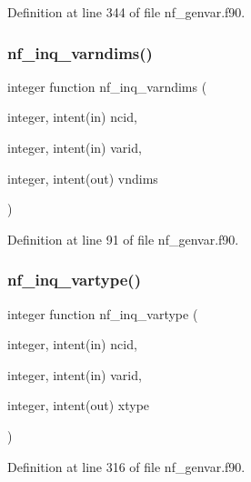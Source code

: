 Definition at line 344 of file nf\+\_\+genvar.\+f90.

\mbox{\label{nf__genvar_8f90_ad20e90a6eea21b7ca37b64e492258a9a}} 
\subsubsection{\texorpdfstring{nf\+\_\+inq\+\_\+varndims()}{nf\_inq\_varndims()}}
{\footnotesize\ttfamily integer function nf\+\_\+inq\+\_\+varndims (\begin{DoxyParamCaption}\item[{integer, intent(in)}]{ncid,  }\item[{integer, intent(in)}]{varid,  }\item[{integer, intent(out)}]{vndims }\end{DoxyParamCaption})}



Definition at line 91 of file nf\+\_\+genvar.\+f90.

\mbox{\label{nf__genvar_8f90_a3bf29346233ca9243a8dc0341919c068}} 
\subsubsection{\texorpdfstring{nf\+\_\+inq\+\_\+vartype()}{nf\_inq\_vartype()}}
{\footnotesize\ttfamily integer function nf\+\_\+inq\+\_\+vartype (\begin{DoxyParamCaption}\item[{integer, intent(in)}]{ncid,  }\item[{integer, intent(in)}]{varid,  }\item[{integer, intent(out)}]{xtype }\end{DoxyParamCaption})}



Definition at line 316 of file nf\+\_\+genvar.\+f90.

\mbox{\label{nf__genvar_8f90_a0415c842d5919fc1f205cfd9b535c734}} 
